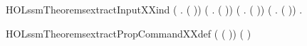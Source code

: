 \begin{SaveVerbatim}{HOLssmTheoremsextractInputXXind}
     (\HOLSymConst{\HOLTokenForall{}} .  (  )) \HOLSymConst{\HOLTokenConj{}}
     (\HOLSymConst{\HOLTokenForall{}} .  (  )) \HOLSymConst{\HOLTokenConj{}}
     (\HOLSymConst{\HOLTokenForall{}} .  (  )) \HOLSymConst{\HOLTokenConj{}}
     (\HOLSymConst{\HOLTokenForall{}} .  (  )) \HOLSymConst{\HOLTokenImp{}}
     \HOLSymConst{\HOLTokenForall{}}.  
\end{SaveVerbatim}
\newcommand{\HOLssmTheoremsextractInputXXind}{\UseVerbatim{HOLssmTheoremsextractInputXXind}}
\begin{SaveVerbatim}{HOLssmTheoremsextractPropCommandXXdef}
\HOLTokenTurnstile{}  (   ( )) \HOLSymConst{=}  ( )
\end{SaveVerbatim}
\newcommand{\HOLssmTheoremsextractPropCommandXXdef}{\UseVerbatim{HOLssmTheoremsextractPropCommandXXdef}}
